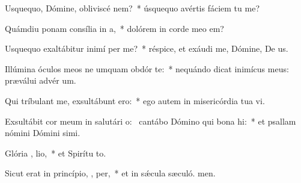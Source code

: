 \item Usquequo, Dómine, obliviscé   nem?~* úsquequo avértis fáciem tu  me?
\item Quámdiu ponam consília in  a,~* dolórem in corde meo  em?
\item Usquequo exaltábitur inimí  per me?~* réspice, et exáudi me, Dómine, De us.
\item Illúmina óculos meos ne umquam obdór  te:~* nequándo dicat inimícus meus: præválui advér um.
\item Qui tríbulant me, exsultábunt   ero:~* ego autem in misericórdia tua vi.
\item Exsultábit cor meum in salutári o:~\pscross{} cantábo Dómino qui bona  hi:~* et psallam nómini Dómini simi.
\item Glória ,  lio,~* et Spirítu to.
\item Sicut erat in princípio,  ,  per,~* et in sǽcula sæculó. men.
